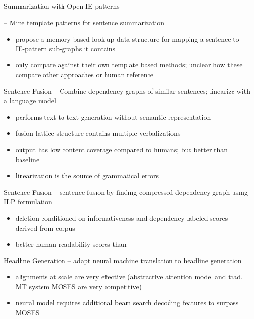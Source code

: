 \documentclass{beamer}
\begin{document}
\begin{frame}{Summarization with Open-IE patterns}

    \cite{pighin2014modelling} -- Mine template patterns for sentence 
        summarization
        \begin{itemize}
            \item propose a memory-based look up data structure for mapping a 
                sentence to IE-pattern sub-graphs it contains
            \item only compare against their own template based methods;
                unclear how these compare other approaches or human reference
        \end{itemize}

\end{frame}


\begin{frame}{Sentence Fusion}
    \cite{barzilay2005sentence} -- Combine dependency graphs of similar 
    sentences; linearize with a language model
    \begin{itemize}
    \item performs text-to-text generation without semantic representation
    \item fusion lattice structure contains multiple verbalizations
    \item output has low content coverage compared to humans;
        but better than baseline
    \item linearization is the source of grammatical errors
    \end{itemize}

\end{frame}

\begin{frame}{Sentence Fusion}
    \cite{filippova2008sentence} -- sentence fusion by finding compressed 
    dependency graph using ILP formulation
    \begin{itemize}
    \item deletion conditioned on informativeness and dependency labeled 
        scores derived from corpus
    \item better human readability scores than \cite{barzilay2005sentence}
    \end{itemize}

\end{frame}

\begin{frame}{Headline Generation}
    \cite{rush2015neural} -- adapt neural machine translation to headline 
        generation
    \begin{itemize}
        \item alignments at scale are very effective (abstractive attention 
            model and trad. MT system MOSES are very competitive)
        \item neural model requires additional beam search decoding features
            to surpass MOSES
    \end{itemize}
\end{frame}






\end{document}
